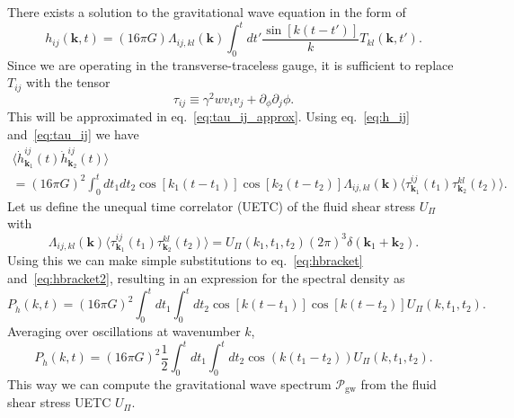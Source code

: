 There exists a solution to the gravitational wave equation in the form of
\cite[eq. 3.2]{hindmarsh_gw_pt_2019}
\begin{equation}
h_{ij} (\bm{k},t) = (16 \pi G) \Lambda_{ij,kl}(\bm{k}) \int_0^t dt' \frac{\sin [k(t-t')]}{k} T_{kl}(\bm{k},t').
\label{eq:h_ij}
\end{equation}
Since we are operating in the transverse-traceless gauge, it is sufficient to replace $T_{ij}$ with the tensor
\cite[eq. 3.7]{hindmarsh_gw_pt_2019}
\begin{equation}
\tau_{ij} \equiv \gamma^2 w v_i v_j + \partial_ \phi \partial_j \phi.
\label{eq:tau_ij}
\end{equation}
This will be approximated in eq.~\eqref{eq:tau_ij_approx}.
Using eq.~\eqref{eq:h_ij} and~\eqref{eq:tau_ij} we have
\cite[eq. 3.8]{hindmarsh_gw_pt_2019}
\begin{multline}
\langle \dot{h}_{\bm{k}_1}^{ij}(t) \dot{h}_{\bm{k}_2}^{ij}(t) \rangle \\
= (16 \pi G)^2 \int_0^t dt_1 dt_2 \cos [k_1(t-t_1)] \cos [k_2(t-t_2)] \Lambda_{ij,kl}(\bm{k})
\langle \tau_{\bm{k}_1}^{ij}(t_1) \tau_{\bm{k}_2}^{kl}(t_2) \rangle.
\end{multline}
Let us define the unequal time correlator (UETC) of the fluid shear stress $U_\Pi$ with
\cite[eq. 3.9]{hindmarsh_gw_pt_2019}
\begin{equation}
\Lambda_{ij,kl}(\bm{k}) \langle \tau_{\bm{k}_1}^{ij}(t_1) \tau_{\bm{k}_2}^{kl}(t_2) \rangle
= U_\Pi (k_1, t_1, t_2) (2 \pi)^3 \delta(\bm{k}_1 + \bm{k}_2).
\label{eq:hbracket2}
\end{equation}
Using this we can make simple substitutions to eq.~\eqref{eq:hbracket} and~\eqref{eq:hbracket2},
resulting in an expression for the spectral density as
\cite[eq. 3.10]{hindmarsh_gw_pt_2019}
\begin{equation}
P_{\dot{h}} (k,t) = (16 \pi G)^2 \int_0^t dt_1 \int_0^t dt_2 \cos [k(t-t_1)] \cos [k(t-t_2)] U_\Pi (k, t_1, t_2).
\label{eq:p_dot_h}
\end{equation}
Averaging over oscillations at wavenumber $k$,
\begin{equation}
P_{\dot{h}} (k,t) = (16 \pi G)^2 \frac{1}{2} \int_0^t dt_1 \int_0^t dt_2 \cos \left( k(t_1 - t_2) \right) U_\Pi (k, t_1, t_2).
\label{eq:p_dot_h_avg}
\end{equation}
This way we can compute the gravitational wave spectrum $\mathcal{P}_\text{gw}$ from the fluid shear stress UETC $U_\Pi$.


